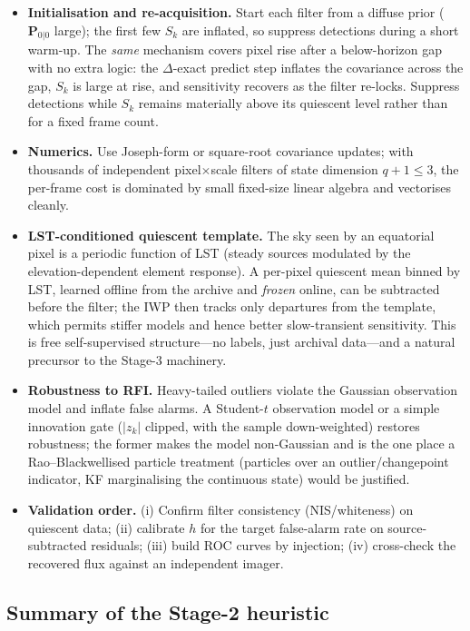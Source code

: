 \documentclass[11pt]{article}
\begin{document}
\begin{itemize}[leftmargin=*]
  \item \textbf{Initialisation and re-acquisition.} Start each filter from a diffuse prior
  ($\bm{P}_{0|0}$ large); the first few $S_k$ are inflated, so suppress detections during a short
  warm-up. The \emph{same} mechanism covers pixel rise after a below-horizon gap with no extra
  logic: the $\Delta$-exact predict step inflates the covariance across the gap, $S_k$ is large at
  rise, and sensitivity recovers as the filter re-locks. Suppress detections while $S_k$ remains
  materially above its quiescent level rather than for a fixed frame count.
  \item \textbf{Numerics.} Use Joseph-form or square-root covariance updates; with
  thousands of independent pixel$\times$scale filters of state dimension $q{+}1\le3$,
  the per-frame cost is dominated by small fixed-size linear algebra and vectorises
  cleanly.
  \item \textbf{LST-conditioned quiescent template.} The sky seen by an equatorial pixel is a
  periodic function of LST (steady sources modulated by the elevation-dependent element response).
  A per-pixel quiescent mean binned by LST, learned offline from the archive and \emph{frozen}
  online, can be subtracted before the filter; the IWP then tracks only departures from the
  template, which permits stiffer models and hence better slow-transient sensitivity. This is free
  self-supervised structure---no labels, just archival data---and a natural precursor to the
  Stage-3 machinery.
  \item \textbf{Robustness to RFI.} Heavy-tailed outliers violate the Gaussian
  observation model and inflate false alarms. A Student-$t$ observation model or a
  simple innovation gate ($|z_k|$ clipped, with the sample down-weighted) restores
  robustness; the former makes the model non-Gaussian and is the one place a
  Rao--Blackwellised particle treatment (particles over an outlier/changepoint
  indicator, KF marginalising the continuous state) would be justified.
  \item \textbf{Validation order.} (i) Confirm filter consistency (NIS/whiteness) on
  quiescent data; (ii) calibrate $h$ for the target false-alarm rate on
  source-subtracted residuals; (iii) build ROC curves by injection; (iv) cross-check
  the recovered flux against an independent imager.
\end{itemize}

\subsection{Summary of the Stage-2 heuristic}
\end{document}
